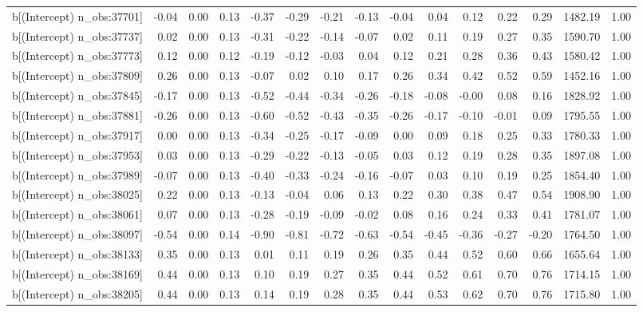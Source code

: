 \begin{table}[ht]
\begin{tabular}{rrrrrrrrrrrrrrr}
  b[(Intercept) n\_obs:37701] & -0.04 & 0.00 & 0.13 & -0.37 & -0.29 & -0.21 & -0.13 & -0.04 & 0.04 & 0.12 & 0.22 & 0.29 & 1482.19 & 1.00 \\ 
  b[(Intercept) n\_obs:37737] & 0.02 & 0.00 & 0.13 & -0.31 & -0.22 & -0.14 & -0.07 & 0.02 & 0.11 & 0.19 & 0.27 & 0.35 & 1590.70 & 1.00 \\ 
  b[(Intercept) n\_obs:37773] & 0.12 & 0.00 & 0.12 & -0.19 & -0.12 & -0.03 & 0.04 & 0.12 & 0.21 & 0.28 & 0.36 & 0.43 & 1580.42 & 1.00 \\ 
  b[(Intercept) n\_obs:37809] & 0.26 & 0.00 & 0.13 & -0.07 & 0.02 & 0.10 & 0.17 & 0.26 & 0.34 & 0.42 & 0.52 & 0.59 & 1452.16 & 1.00 \\ 
  b[(Intercept) n\_obs:37845] & -0.17 & 0.00 & 0.13 & -0.52 & -0.44 & -0.34 & -0.26 & -0.18 & -0.08 & -0.00 & 0.08 & 0.16 & 1828.92 & 1.00 \\ 
  b[(Intercept) n\_obs:37881] & -0.26 & 0.00 & 0.13 & -0.60 & -0.52 & -0.43 & -0.35 & -0.26 & -0.17 & -0.10 & -0.01 & 0.09 & 1795.55 & 1.00 \\ 
  b[(Intercept) n\_obs:37917] & 0.00 & 0.00 & 0.13 & -0.34 & -0.25 & -0.17 & -0.09 & 0.00 & 0.09 & 0.18 & 0.25 & 0.33 & 1780.33 & 1.00 \\ 
  b[(Intercept) n\_obs:37953] & 0.03 & 0.00 & 0.13 & -0.29 & -0.22 & -0.13 & -0.05 & 0.03 & 0.12 & 0.19 & 0.28 & 0.35 & 1897.08 & 1.00 \\ 
  b[(Intercept) n\_obs:37989] & -0.07 & 0.00 & 0.13 & -0.40 & -0.33 & -0.24 & -0.16 & -0.07 & 0.03 & 0.10 & 0.19 & 0.25 & 1854.40 & 1.00 \\ 
  b[(Intercept) n\_obs:38025] & 0.22 & 0.00 & 0.13 & -0.13 & -0.04 & 0.06 & 0.13 & 0.22 & 0.30 & 0.38 & 0.47 & 0.54 & 1908.90 & 1.00 \\ 
  b[(Intercept) n\_obs:38061] & 0.07 & 0.00 & 0.13 & -0.28 & -0.19 & -0.09 & -0.02 & 0.08 & 0.16 & 0.24 & 0.33 & 0.41 & 1781.07 & 1.00 \\ 
  b[(Intercept) n\_obs:38097] & -0.54 & 0.00 & 0.14 & -0.90 & -0.81 & -0.72 & -0.63 & -0.54 & -0.45 & -0.36 & -0.27 & -0.20 & 1764.50 & 1.00 \\ 
  b[(Intercept) n\_obs:38133] & 0.35 & 0.00 & 0.13 & 0.01 & 0.11 & 0.19 & 0.26 & 0.35 & 0.44 & 0.52 & 0.60 & 0.66 & 1655.64 & 1.00 \\ 
  b[(Intercept) n\_obs:38169] & 0.44 & 0.00 & 0.13 & 0.10 & 0.19 & 0.27 & 0.35 & 0.44 & 0.52 & 0.61 & 0.70 & 0.76 & 1714.15 & 1.00 \\ 
  b[(Intercept) n\_obs:38205] & 0.44 & 0.00 & 0.13 & 0.14 & 0.19 & 0.28 & 0.35 & 0.44 & 0.53 & 0.62 & 0.70 & 0.76 & 1715.80 & 1.00 \\ 

\end{tabular}
\end{table}
